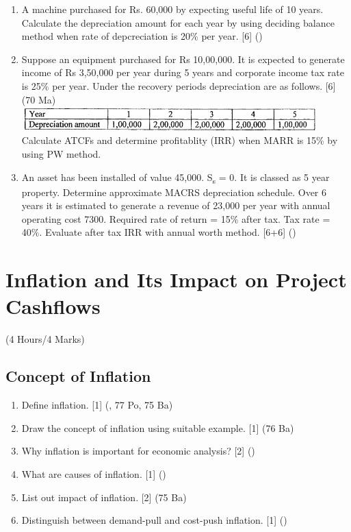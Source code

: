\documentclass[12pt]{article}
\newcommand{\sub}[1]{\textsubscript{#1}}
\begin{document}
\begin{enumerate}
			\item A machine purchased for Rs. 60,000 by expecting useful life of 10 years. Calculate the depreciation amount for each year by using deciding balance method when rate of depcreciation is 20\% per year. \hfill [6] ()

			\item Suppose an equipment purchased for Rs 10,00,000. It is expected to generate income of Rs 3,50,000 per year during 5 years and corporate income tax rate is 25\% per year. Under the recovery periods depreciation are as follows. \hfill [6] (70 Ma)\\
			\includegraphics[width=4.5in]{./pics/ee_6}\\
			Calculate ATCFs and determine profitablity (IRR) when MARR is 15\% by using PW method.

			\item An asset has been installed of value 45,000. S\sub{s} = 0. It is classed as 5 year property. Determine approximate MACRS depreciation schedule. Over 6 years it is estimated to generate a revenue of 23,000 per year with annual operating cost 7300. Required rate of return = 15\% after tax. Tax rate = 40\%. Evaluate after tax IRR with annual worth method. \hfill [6+6] ()
		\end{enumerate}

	\pagebreak

\section{Inflation and Its Impact on Project Cashflows}
	\begin{center}(4 Hours/4 Marks)\end{center}
	\subsection{Concept of Inflation}
		\begin{enumerate}[noitemsep, topsep=0pt]
			\item Define inflation. \hfill [1] (, 77 Po, 75 Ba)

			\item Draw the concept of inflation using suitable example. \hfill [1] (76 Ba)

			\item Why inflation is important for economic analysis? \hfill [2] ()

			\item What are causes of inflation. \hfill [1] ()

			\item List out impact of inflation. \hfill [2] (75 Ba)

			\item Distinguish between demand-pull and cost-push inflation. \hfill [1] ()
		\end{enumerate}
\end{document}
